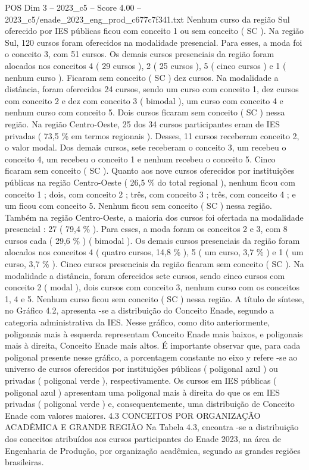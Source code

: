 \begin{textsample}{POS Dim 3 – 2023\_c5 – Score 4.00 – 2023\_c5/enade\_2023\_eng\_prod\_c677c7f341.txt}
Nenhum curso da região Sul oferecido por IES públicas ficou com conceito 1 ou sem conceito ( SC ).
Na região Sul, 120 cursos foram oferecidos na modalidade presencial.
Para esses, a moda foi o conceito 3, com 51 cursos.
Os demais cursos presenciais da região foram alocados nos conceitos 4 ( 29 cursos ), 2 ( 25 cursos ), 5 ( cinco cursos ) e 1 ( nenhum curso ).
Ficaram sem conceito ( SC ) dez cursos.
Na modalidade a distância, foram oferecidos 24 cursos, sendo um curso com conceito 1, dez cursos com conceito 2 e dez com conceito 3 ( bimodal ), um curso com conceito 4 e nenhum curso com conceito 5.
Dois cursos ficaram sem conceito ( SC ) nessa região.
Na região Centro-Oeste, 25 dos 34 cursos participantes eram de IES privadas ( 73,5 \% em termos regionais ).
Desses, 11 cursos receberam conceito 2, o valor modal.
Dos demais cursos, sete receberam o conceito 3, um recebeu o conceito 4, um recebeu o conceito 1 e nenhum recebeu o conceito 5.
Cinco ficaram sem conceito ( SC ).
Quanto aos nove cursos oferecidos por instituições públicas na região Centro-Oeste ( 26,5 \% do total regional ), nenhum ficou com conceito 1 ; dois, com conceito 2 ; três, com conceito 3 ; três, com conceito 4 ; e um ficou com conceito 5.
Nenhum ficou sem conceito ( SC ) nessa região.
Também na região Centro-Oeste, a maioria dos cursos foi ofertada na modalidade presencial : 27 ( 79,4 \% ).
Para esses, a moda foram os conceitos 2 e 3, com 8 cursos cada ( 29,6 \% ) ( bimodal ).
Os demais cursos presenciais da região foram alocados nos conceitos 4 ( quatro cursos, 14,8 \% ), 5 ( um curso, 3,7 \% ) e 1 ( um curso, 3,7 \% ).
Cinco cursos presenciais da região ficaram sem conceito ( SC ).
Na modalidade a distância, foram oferecidos sete cursos, sendo cinco cursos com conceito 2 ( modal ), dois cursos com conceito 3, nenhum curso com os conceitos 1, 4 e 5.
Nenhum curso ficou sem conceito ( SC ) nessa região.
A título de síntese, no Gráfico 4.2, apresenta -se a distribuição do Conceito Enade, segundo a categoria administrativa da IES.
Nesse gráfico, como dito anteriormente, poligonais mais à esquerda representam Conceito Enade mais baixos, e poligonais mais à direita, Conceito Enade mais altos.
É importante observar que, para cada poligonal presente nesse gráfico, a porcentagem constante no eixo y refere -se ao universo de cursos oferecidos por instituições públicas ( poligonal azul ) ou privadas ( poligonal verde ), respectivamente.
Os cursos em IES públicas ( poligonal azul ) apresentam uma poligonal mais à direita do que os em IES privadas ( poligonal verde ) e, consequentemente, uma distribuição de Conceito Enade com valores maiores. 4.3 CONCEITOS POR ORGANIZAÇÃO ACADÊMICA E GRANDE REGIÃO Na Tabela 4.3, encontra -se a distribuição dos conceitos atribuídos aos cursos participantes do Enade 2023, na área de Engenharia de Produção, por organização acadêmica, segundo as grandes regiões brasileiras.

\end{textsample}
